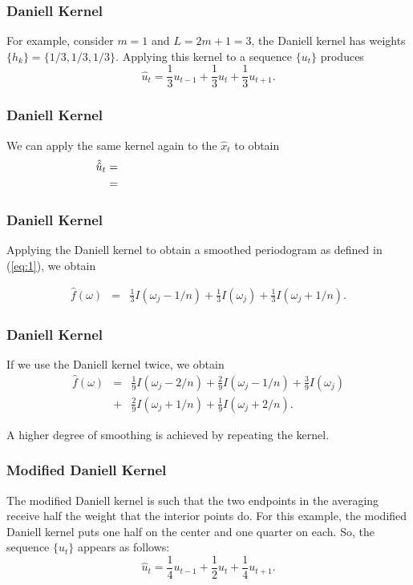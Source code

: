\documentclass[%
xcolor=pdftex]{beamer}
\begin{document}
\begin{frame}
\frametitle{Daniell Kernel}

For example, consider $m=1$ and
$L=2m+1=3$, the Daniell kernel has weights
$\{h_k\}=\{1/3,1/3,1/3\}.$ Applying this kernel to a sequence
 $\{u_t\}$ produces
$$
\hat{u}_t=\frac{1}{3} u_{t-1}+\frac{1}{3} u_{t}+\frac{1}{3} u_{t+1}.
$$

\end{frame}

\begin{frame}
\frametitle{Daniell Kernel}

We can apply the same kernel again to the $\hat{x}_t$ to obtain
\begin{eqnarray*}
\hat{\hat{u}}_t &=& \hspace{60mm} \\
                &=& \hspace{60mm}
\end{eqnarray*}



\end{frame}

\begin{frame}
\frametitle{Daniell Kernel}

Applying the Daniell kernel to obtain a smoothed periodogram as defined in (\ref{eq:1}), we
obtain

\begin{eqnarray*}
\widehat{f}(\omega) &=& \frac{1}{3} I(\omega_j - 1/n) + \frac{1}{3} I(\omega_j ) + \frac{1}{3} I(\omega_j + 1/n).
\end{eqnarray*}

\end{frame}


\begin{frame}
\frametitle{Daniell Kernel}

If we use the Daniell kernel twice, we obtain
\begin{eqnarray*}
\widehat{f}(\omega) &=& \frac{1}{9} I(\omega_j - 2/n) + \frac{2}{9} I(\omega_j - 1/n) +\frac{3}{9} I(\omega_j ) \\
                    &+& \frac{2}{9} I(\omega_j + 1/n) +\frac{1}{9} I(\omega_j + 2/n).
\end{eqnarray*}

A higher degree of smoothing is achieved by repeating the kernel.

\end{frame}

\begin{frame}[fragile]
\frametitle{Modified Daniell Kernel}

The modified Daniell kernel is such that the two endpoints in the averaging receive half the weight that the interior points do. For this example, the modified Daniell kernel puts one half on the center and one quarter on each. So, the sequence $\{u_t\}$ appears as follows:
$$
\hat{u}_t=\frac{1}{4} u_{t-1}+\frac{1}{2} u_{t}+\frac{1}{4} u_{t+1}.
$$


\end{frame}
\end{document}
